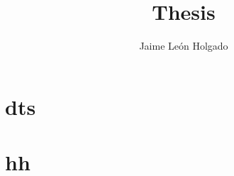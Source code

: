 \documentclass[10pt,a4paper]{report}
\author{Jaime León Holgado}
\title{Thesis}
\begin{document}
\maketitle

\tableofcontents

\part{dts}

\part{hh}

\end{document}
